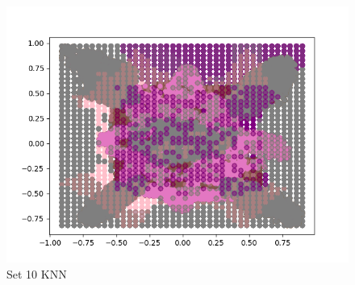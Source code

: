\documentclass{article}
\begin{document}
\begin{figure}[H]
\begin{minipage}{.33\textwidth}
			\includegraphics[width=1\linewidth]{../set10KNNdecisions.png}
			\caption{Set 10 KNN}
	\end{minipage}\hfill
\end{figure}
\end{document}
